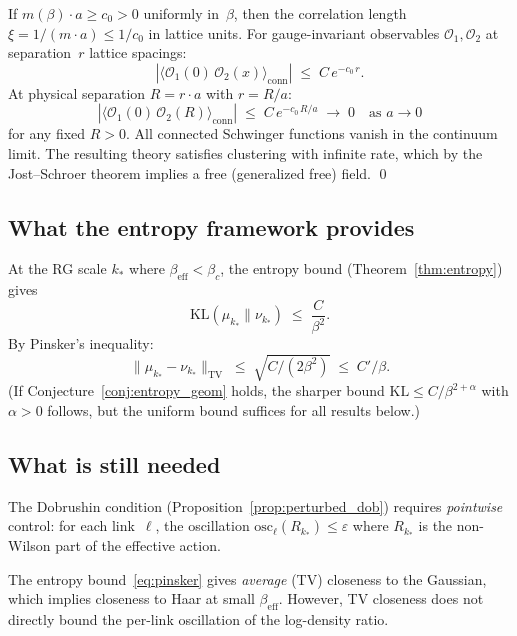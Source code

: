 \documentclass[11pt,a4paper]{article}
\theoremstyle{plain}
\theoremstyle{definition}
\theoremstyle{remark}
\newcommand{\KL}{\mathrm{KL}}
\newcommand{\TV}{\mathrm{TV}}
\newcommand{\osc}{\mathrm{osc}}
\begin{document}
If $m(\beta) \cdot a \geq c_0 > 0$ uniformly in~$\beta$, then
the correlation length $\xi = 1/(m \cdot a) \leq 1/c_0$
in lattice units.  For gauge-invariant observables
$\mathcal{O}_1, \mathcal{O}_2$ at separation~$r$ lattice spacings:
\begin{equation}
  |\langle \mathcal{O}_1(0)\,\mathcal{O}_2(x)\rangle_{\mathrm{conn}}|
  \;\leq\; C\,e^{-c_0\,r}.
\end{equation}
At physical separation $R = r \cdot a$ with $r = R/a$:
\begin{equation}
  |\langle \mathcal{O}_1(0)\,\mathcal{O}_2(R)\rangle_{\mathrm{conn}}|
  \;\leq\; C\,e^{-c_0\,R/a} \;\to\; 0 \quad \text{as } a \to 0
\end{equation}
for any fixed $R > 0$.  All connected Schwinger functions
vanish in the continuum limit.  The resulting theory
satisfies clustering with infinite rate, which by the
Jost--Schroer theorem implies a free (generalized free) field.
\qed

\subsection{What the entropy framework provides}

At the RG scale $k_*$ where $\beta_{\mathrm{eff}} < \beta_c$,
the entropy bound (Theorem~\ref{thm:entropy}) gives
\begin{equation}
  \KL(\mu_{k_*} \| \nu_{k_*})
  \;\leq\; \frac{C}{\beta^2}.
\end{equation}
By Pinsker's inequality:
\begin{equation}\label{eq:pinsker}
  \|\mu_{k_*} - \nu_{k_*}\|_{\TV}
  \;\leq\; \sqrt{C / (2\beta^{2})}
  \;\leq\; C' / \beta.
\end{equation}
\textup{(}If Conjecture~\ref{conj:entropy_geom}
holds, the sharper bound
$\KL \leq C/\beta^{2+\alpha}$ with
$\alpha > 0$ follows, but the uniform
bound suffices for all results below.\textup{)}

\subsection{What is still needed}

The Dobrushin condition (Proposition~\ref{prop:perturbed_dob})
requires \emph{pointwise} control: for each link~$\ell$,
the oscillation $\osc_\ell(R_{k_*}) \leq \varepsilon$
where $R_{k_*}$ is the non-Wilson part of the effective action.

The entropy bound~\eqref{eq:pinsker} gives
\emph{average} (TV) closeness to the Gaussian, which
implies closeness to Haar at small $\beta_{\mathrm{eff}}$.
However, TV closeness does not directly bound the
per-link oscillation of the log-density ratio.
\end{document}
